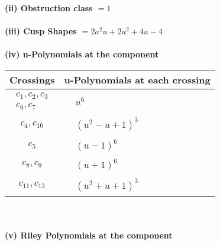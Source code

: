 \documentclass[1p]{elsarticle_modified}
\theoremstyle{definition}
\begin{document}
\flushleft \textbf{(ii) Obstruction class $= 1$}\\~\\
\flushleft \textbf{(iii) Cusp Shapes $= 2 a^2 u+2 a^2+4 u-4$}\\~\\
\newpage\renewcommand{\arraystretch}{1}
\flushleft \textbf{(iv) u-Polynomials at the component}\newline \\
\begin{tabular}{m{50pt}|m{274pt}}
Crossings & \hspace{64pt}u-Polynomials at each crossing \\
\hline $$\begin{aligned}c_{1},c_{2},c_{3}\\c_{6},c_{7}\end{aligned}$$&$\begin{aligned}
&u^6
\end{aligned}$\\
\hline $$\begin{aligned}c_{4},c_{10}\end{aligned}$$&$\begin{aligned}
&(u^2- u+1)^3
\end{aligned}$\\
\hline $$\begin{aligned}c_{5}\end{aligned}$$&$\begin{aligned}
&(u-1)^6
\end{aligned}$\\
\hline $$\begin{aligned}c_{8},c_{9}\end{aligned}$$&$\begin{aligned}
&(u+1)^6
\end{aligned}$\\
\hline $$\begin{aligned}c_{11},c_{12}\end{aligned}$$&$\begin{aligned}
&(u^2+u+1)^3
\end{aligned}$\\
\hline
\end{tabular}\\~\\
\newpage\renewcommand{\arraystretch}{1}
\flushleft \textbf{(v) Riley Polynomials at the component}\newline \\
\end{document}
